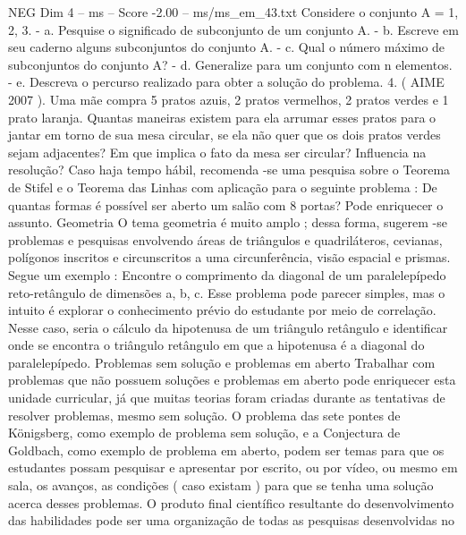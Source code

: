 \begin{textsample}{NEG Dim 4 – ms – Score -2.00 – ms/ms\_em\_43.txt}
Considere o conjunto A = 1, 2, 3. - a.
Pesquise o significado de subconjunto de um conjunto A. - b.
Escreve em seu caderno alguns subconjuntos do conjunto A. - c.
Qual o número máximo de subconjuntos do conjunto A? - d.
Generalize para um conjunto com n elementos. - e.
Descreva o percurso realizado para obter a solução do problema. 4. ( AIME 2007 ).
Uma mãe compra 5 pratos azuis, 2 pratos vermelhos, 2 pratos verdes e 1 prato laranja.
Quantas maneiras existem para ela arrumar esses pratos para o jantar em torno de sua mesa circular, se ela não quer que os dois pratos verdes sejam adjacentes?
Em que implica o fato da mesa ser circular?
Influencia na resolução?
Caso haja tempo hábil, recomenda -se uma pesquisa sobre o Teorema de Stifel e o Teorema das Linhas com aplicação para o seguinte problema : De quantas formas é possível ser aberto um salão com 8 portas?
Pode enriquecer o assunto.
Geometria O tema geometria é muito amplo ; dessa forma, sugerem -se problemas e pesquisas envolvendo áreas de triângulos e quadriláteros, cevianas, polígonos inscritos e circunscritos a uma circunferência, visão espacial e prismas.
Segue um exemplo : Encontre o comprimento da diagonal de um paralelepípedo reto-retângulo de dimensões a, b, c.
Esse problema pode parecer simples, mas o intuito é explorar o conhecimento prévio do estudante por meio de correlação.
Nesse caso, seria o cálculo da hipotenusa de um triângulo retângulo e identificar onde se encontra o triângulo retângulo em que a hipotenusa é a diagonal do paralelepípedo.
Problemas sem solução e problemas em aberto Trabalhar com problemas que não possuem soluções e problemas em aberto pode enriquecer esta unidade curricular, já que muitas teorias foram criadas durante as tentativas de resolver problemas, mesmo sem solução.
O problema das sete pontes de Königsberg, como exemplo de problema sem solução, e a Conjectura de Goldbach, como exemplo de problema em aberto, podem ser temas para que os estudantes possam pesquisar e apresentar por escrito, ou por vídeo, ou mesmo em sala, os avanços, as condições ( caso existam ) para que se tenha uma solução acerca desses problemas.
O produto final científico resultante do desenvolvimento das habilidades pode ser uma organização de todas as pesquisas desenvolvidas no

\end{textsample}
